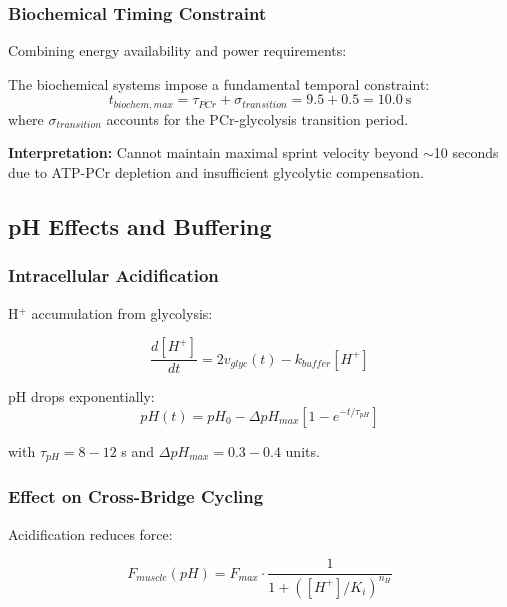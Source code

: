 \subsubsection{Biochemical Timing Constraint}

Combining energy availability and power requirements:

\begin{theorem}
The biochemical systems impose a fundamental temporal constraint:
\begin{equation}
t_{biochem,max} = \tau_{PCr} + \sigma_{transition} = 9.5 + 0.5 = 10.0~\text{s}
\label{eq:biochem_limit}
\end{equation}
where $\sigma_{transition}$ accounts for the PCr-glycolysis transition period.
\end{theorem}

\textbf{Interpretation:} Cannot maintain maximal sprint velocity beyond $\sim$10 seconds due to ATP-PCr depletion and insufficient glycolytic compensation.

\subsection{pH Effects and Buffering}

\subsubsection{Intracellular Acidification}

H$^+$ accumulation from glycolysis:

\begin{equation}
\frac{d[H^+]}{dt} = 2 v_{glyc}(t) - k_{buffer}[H^+]
\label{eq:acidification}
\end{equation}

pH drops exponentially:
\begin{equation}
pH(t) = pH_0 - \Delta pH_{max} \left[1 - e^{-t/\tau_{pH}}\right]
\label{eq:ph_dynamics}
\end{equation}

with $\tau_{pH} = 8-12$ s and $\Delta pH_{max} = 0.3-0.4$ units.

\subsubsection{Effect on Cross-Bridge Cycling}

Acidification reduces force:

\begin{equation}
F_{muscle}(pH) = F_{max} \cdot \frac{1}{1 + ([H^+]/K_i)^{n_H}}
\label{eq:ph_force_relationship}
\end{equation}

